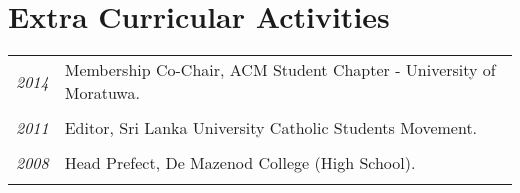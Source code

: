 \documentclass[a4paper,10pt]{article}
\begin{document}
\section{Extra Curricular Activities}
\begin{tabular}{p{3cm}p{13.5cm}}
\emph{2014} & Membership Co-Chair, ACM Student Chapter - University of Moratuwa.\\\\

\emph{2011} & Editor, Sri Lanka University Catholic Students Movement.\\\\
\emph{2008} & Head Prefect, De Mazenod College (High School).\\\\
\end{tabular}
\end{document}
